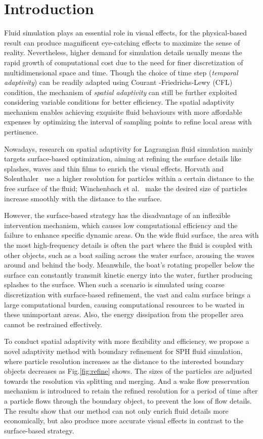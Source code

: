 \documentclass[VANCOUVER,STIX1COL]{WileyNJD-v2}
\begin{document}
\section{Introduction}
Fluid simulation plays an essential role in visual effects, for the physical-based result can produce magnificent eye-catching effects to maximize the sense of reality. Nevertheless, higher demand for simulation details usually means the rapid growth of computational cost due to the need for finer discretization of multidimensional space and time. Though the choice of time step (\emph{temporal adaptivity}) can be readily adapted using Courant
-Friedrichs-Lewy (CFL) condition, the mechanism of \emph{spatial adaptivity} can still be further exploited considering variable conditions for better efficiency. The spatial adaptivity mechanism enables achieving exquisite fluid behaviours with more affordable expenses by optimizing the interval of sampling points to refine local areas with pertinence.

Nowadays, research on spatial adaptivity for Lagrangian fluid simulation mainly targets surface-based optimization, aiming at refining the surface details like splashes, waves and thin films to enrich the visual effects. Horvath and Solenthaler~\cite{Horvath13} use a higher resolution for particles within a certain distance to the free surface of the fluid; Winchenbach et al.~\cite{Winchenbach17} make the desired size of particles increase smoothly with the distance to the surface.

However, the surface-based strategy has the disadvantage of an inflexible intervention mechanism, which causes low computational efficiency and the failure to enhance specific dynamic areas. On the wide fluid surface, the area with the most high-frequency details is often the part where the fluid is coupled with other objects, such as a boat sailing across the water surface, arousing the waves around and behind the body. Meanwhile, the boat's rotating propeller below the surface can constantly transmit kinetic energy into the water, further producing splashes to the surface. When such a scenario is simulated using coarse discretization with surface-based refinement, the vast and calm surface brings a large computational burden, causing computational resources to be wasted in these unimportant areas. Also, the energy dissipation from the propeller area cannot be restrained effectively. 

To conduct spatial adaptivity with more flexibility and efficiency, we propose a novel adaptivity method with boundary refinement for SPH fluid simulation, where particle resolution increases as the distance to the interested boundary objects decreases as Fig.\ref{fig:refine} shows. The sizes of the particles are adjusted towards the resolution via splitting and merging. And a wake flow preservation mechanism is introduced to retain the refined resolution for a period of time after a particle flows through the boundary object, to prevent the loss of flow details. The results show that our method can not only enrich fluid details more economically, but also produce more accurate visual effects in contrast to the surface-based strategy.
\end{document}
